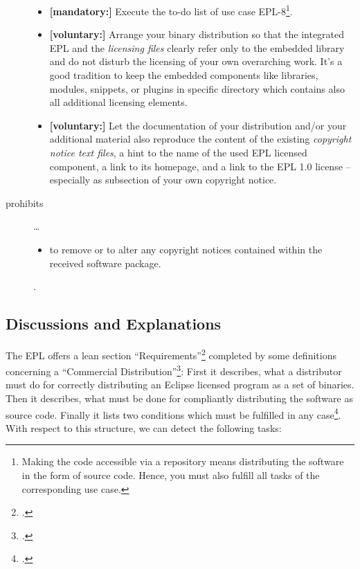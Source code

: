 \begin{description}
\begin{itemize}
  \item \textbf{[mandatory:]} Execute the to-do list of use case EPL-8\footnote{
  Making the code accessible via a repository means distributing the software in
  the form of source code. Hence, you must also fulfill all tasks of the
  corresponding use case.}.
  
  \item \textbf{[voluntary:]} Arrange your binary distribution so that the
  integrated EPL and the \emph{licensing files} clearly refer only to the
  embedded library and do not disturb the licensing of your own overarching
  work. It's a good tradition to keep the embedded components like libraries,
  modules, snippets, or plugins in specific directory which contains also all
  additional licensing elements.
  
  \item \textbf{[voluntary:]} Let the documentation of your distribution and/or
  your additional material  also reproduce the content of the existing
  \emph{copyright notice text files}, a hint to the name of the used EPL
  licensed component, a link to its homepage, and a link to the EPL 1.0 license
  -- especially as subsection of your own copyright notice.
  
\end{itemize}

\item[prohibits] \ldots
\begin{itemize}
  \item to remove or to alter any copyright notices contained within the
  received software package.
\end{itemize}.

\end{description}

\subsection{Discussions and Explanations}

The EPL offers a lean section
\enquote{Requirements}\footcite[cf.][\nopage wp\ §3]{Epl10OsiLicense2005a}
completed by some definitions concerning a \enquote{Commercial
Distribution}\footcite[cf.][\nopage wp\ §4]{Epl10OsiLicense2005a}: First it
describes, what a distributor must do for correctly distributing an Eclipse
licensed program as a set of binaries. Then it describes, what must be done for
compliantly distributing the software as source code. Finally it lists two
conditions which must be fulfilled in any case\footcite[cf.][\nopage wp\
§3]{Epl10OsiLicense2005a}. With respect to this structure, we can detect the
following tasks:

